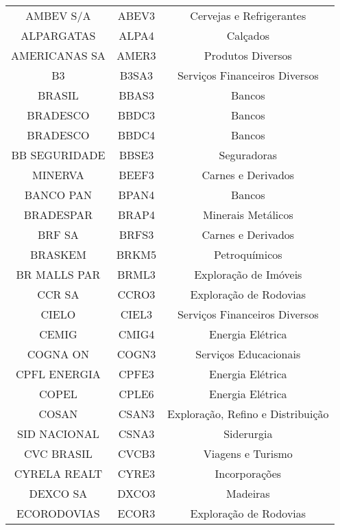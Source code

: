 \begin{center}
{\begin{longtable}[c]{ccc}
            AMBEV S/A & ABEV3 & Cervejas e Refrigerantes \\
            ALPARGATAS & ALPA4 & Calçados \\
            AMERICANAS SA & AMER3 & Produtos Diversos \\
            B3 & B3SA3 & Serviços Financeiros Diversos \\
            BRASIL & BBAS3 & Bancos \\
            BRADESCO & BBDC3 & Bancos \\
            BRADESCO & BBDC4 & Bancos \\
            BB SEGURIDADE & BBSE3 & Seguradoras \\
            MINERVA & BEEF3 & Carnes e Derivados \\
            BANCO PAN & BPAN4 & Bancos \\
            BRADESPAR & BRAP4 & Minerais Metálicos \\
            BRF SA & BRFS3 & Carnes e Derivados \\
            BRASKEM & BRKM5 & Petroquímicos \\
            BR MALLS PAR & BRML3 & Exploração de Imóveis \\
            CCR SA & CCRO3 & Exploração de Rodovias \\
            CIELO & CIEL3 & Serviços Financeiros Diversos \\
            CEMIG & CMIG4 & Energia Elétrica \\
            COGNA ON & COGN3 & Serviços Educacionais \\
            CPFL ENERGIA & CPFE3 & Energia Elétrica \\
            COPEL & CPLE6 & Energia Elétrica \\
            COSAN & CSAN3 & Exploração, Refino e Distribuição \\
            SID NACIONAL & CSNA3 & Siderurgia \\
            CVC BRASIL & CVCB3 & Viagens e Turismo \\
            CYRELA REALT & CYRE3 & Incorporações \\
            DEXCO SA & DXCO3 & Madeiras \\
            ECORODOVIAS & ECOR3 & Exploração de Rodovias \\

\end{longtable}}
\end{center}
